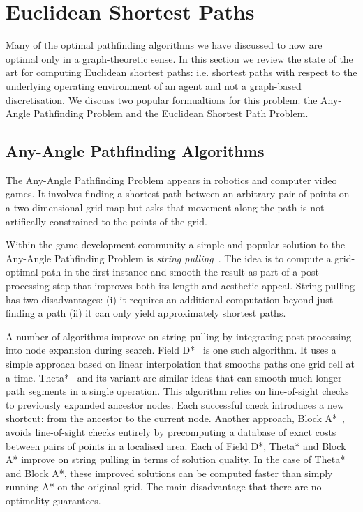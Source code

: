 \section{Euclidean Shortest Paths}
\label{cha::lit::euclidean}
Many of the optimal pathfinding algorithms we have discussed to now are optimal only in 
a graph-theoretic sense. In this section we review the state of the art for computing
Euclidean shortest paths: i.e. shortest paths with respect to the underlying operating 
environment of an agent and not a graph-based discretisation. We discuss two popular
formualtions for this problem: the Any-Angle Pathfinding Problem and the Euclidean Shortest
Path Problem. 

\subsection{Any-Angle Pathfinding Algorithms}
\label{cha::lit::euclidean:anyangle}
The Any-Angle Pathfinding Problem appears in robotics and computer video games. It involves finding
a shortest path between an arbitrary pair of points on a two-dimensional grid map but asks that
movement along the path is not artifically constrained to the points of the grid.

Within the game development community a simple and popular solution to the Any-Angle Pathfinding
Problem is \emph{string pulling}~\cite{pinter01,botea04}.  The idea is to compute a grid-optimal
path in the first instance and smooth the result as part of a post-processing step that improves
both its length and aesthetic appeal. String pulling has two disadvantages: (i) it requires an
additional computation beyond just finding a path (ii) it can only yield approximately shortest
paths.

A number of algorithms improve on string-pulling by integrating post-processing into node expansion
during search. Field D*~\citep{ferguson05} is one such algorithm. It uses a simple approach based on
linear interpolation that smooths paths one grid cell at a time.  Theta*~\citep{nash07} and its
variant \citep{nash09,nash10} are similar ideas that can smooth much longer path segments in a
single operation. This algorithm relies on line-of-sight checks to previously expanded ancestor
nodes. Each successful check introduces a new shortcut: from the ancestor to the current node.
Another approach, Block A*~\cite{yap11}, avoids line-of-sight checks entirely by
precomputing a database of exact costs between pairs of points in a localised area. 
Each of Field D*, Theta* and Block A* improve on string pulling in terms of solution quality. 
In the case of Theta* and Block A*, these improved solutions can be computed faster than 
simply running A* on the original grid. The main disadvantage that there are no optimality
guarantees.

